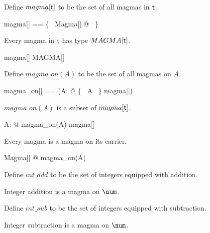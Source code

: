 \documentclass{amsart}
\begin{document}
Define $magma[\mathsf{t}]$ to be the set of all magmas in $\mathsf{t}$.

\begin{zed}
	magma[\genT] == \{~ Magma[\genT] @ \strucA ~\}
\end{zed}

\begin{remark}
Every magma in $\mathsf{t}$ has type $MAGMA[\mathsf{t}]$.

\begin{zed}
	magma[\setT] \subseteq MAGMA[\setT]
\end{zed}

\end{remark}

Define $magma\_on(A)$ to be the set of all magmas on $A$.

\begin{zed}
	magma\_on[\genT] == (\lambda A: \power \genT @ \{~ A ~\} \dres magma[\genT])
\end{zed}

\begin{remark}
$magma\_on(A)$ is a subset of $magma[\mathsf{t}]$.

\begin{zed}
	\forall A:  \power \setT @ magma\_on(A) \subseteq magma[\setT]
\end{zed}
\end{remark}

\begin{remark}
Every magma is a magma on its carrier.

\begin{zed}
	\forall Magma[\setT] @ \strucA \in magma\_on(A)
\end{zed}

\end{remark}

\begin{example}

Define $int\_add$ to be the set of integers equipped with addition.

Integer addition is a magma on $\num$.
\end{example}

\begin{example}

Define $int\_sub$ to be the set of integers equipped with subtraction.


Integer subtraction is a magma on $\num$.


\end{example}
\end{document}
